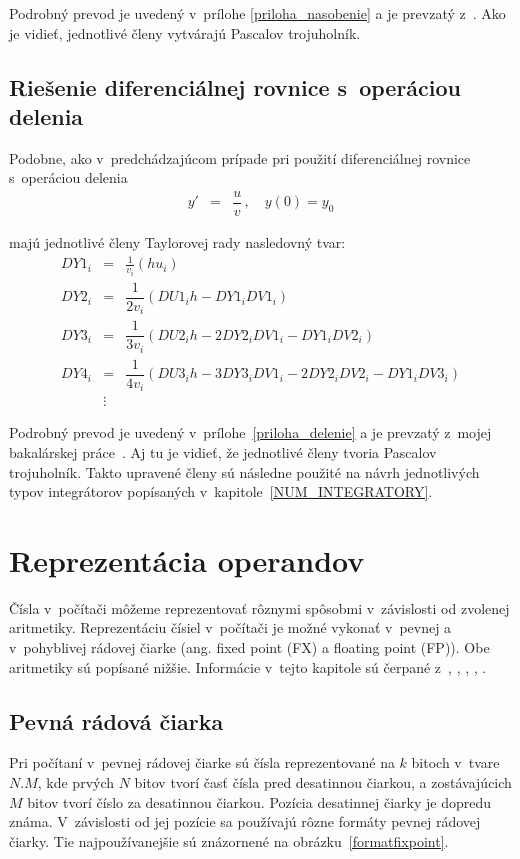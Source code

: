 Podrobný prevod je uvedený v~prílohe \ref{priloha_nasobenie} a je prevzatý z~\cite{ZavadaBP}. Ako je vidieť, jednotlivé členy vytvárajú Pascalov trojuholník.


\section{Riešenie diferenciálnej rovnice s~operáciou delenia}
Podobne, ako v~predchádzajúcom prípade pri použití diferenciálnej rovnice s~operáciou delenia
\begin{eqnarray}
y' & = & \dfrac{u}{v} \, , \quad y(0) = y_{0} \label{dif_delenie}
\end{eqnarray}

majú jednotlivé členy Taylorovej rady nasledovný tvar:
\begin{eqnarray}
DY1_{i} & = & \frac{1}{v_{i}} (hu_{i}) \label{DY1_cleny_delenia} \\
DY2_{i} & = & \dfrac{1}{2v_{i}} (DU1_{i}h - DY1_{i}DV1_{i}) \label{DY2_cleny_delenia} \\
DY3_{i} & = & \dfrac{1}{3v_{i}} ( DU2_{i}h - 2DY2_{i}DV1_{i} - DY1_{i}DV2_{i} ) \label{DY3_cleny_delenia} \\
DY4_{i} & = & \dfrac{1}{4v_{i}} ( DU3_{i}h - 3DY3_{i}DV1_{i} - 2DY2_{i}DV2_{i} - DY1_{i}DV3_{i} ) \label{DY4_cleny_delenia} \\ 
& \vdots \nonumber & 
\end{eqnarray}

Podrobný prevod je uvedený v~prílohe~\ref{priloha_delenie} a je prevzatý z~mojej bakalárskej práce~\cite{MatecnyBP}. Aj tu je vidieť, že jednotlivé členy tvoria Pascalov trojuholník. Takto upravené členy sú následne použité na návrh jednotlivých typov integrátorov popísaných v~kapitole~\ref{NUM_INTEGRATORY}.



\chapter{Reprezentácia operandov} \label{REPREZENTACIA_OPERANDOV}
Čísla v~počítači môžeme reprezentovať rôznymi spôsobmi v~závislosti od zvolenej aritmetiky. Reprezentáciu čísiel v~počítači je možné vykonať v~pevnej a v~pohyblivej rádovej čiarke (ang. fixed point (FX) a floating point (FP)). Obe aritmetiky sú popísané nižšie. Informácie v~tejto kapitole sú čerpané z~\cite{FXOnline}, \cite{FPOnline}, \cite{KrausDisP}, \cite{inpFP}, \cite{inpRepDat}.


\section{Pevná rádová čiarka}
Pri počítaní v~pevnej rádovej čiarke sú čísla reprezentované na $ k $ bitoch v~tvare $ N.M $, kde prvých $ N $ bitov tvorí časť čísla pred desatinnou čiarkou, a zostávajúcich $ M $ bitov tvorí číslo za desatinnou čiarkou. Pozícia desatinnej čiarky je dopredu známa. V~závislosti od jej pozície sa používajú rôzne formáty pevnej rádovej čiarky. Tie najpoužívanejšie sú znázornené na obrázku~\ref{formatfixpoint}.

